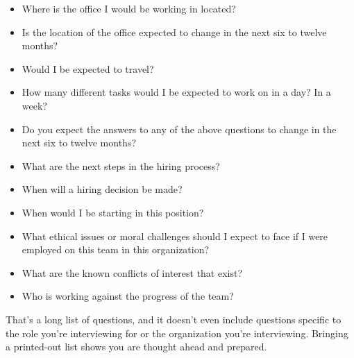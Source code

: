 \begin{itemize}
    \item Where is the office I would be working in located?
    \item Is the location of the office expected to change in the next six to twelve months?
    \item Would I be expected to travel?
    
    \item How many different tasks would I be expected to work on in a day? In a week?
    
    \item Do you expect the answers to any of the above questions to change in the next six to twelve months?

    \item What are the next steps in the hiring process?
    \item When will a hiring decision be made?
    \item When would I be starting in this position?
    
    \item What ethical issues or moral challenges should I expect to face if I were employed on this team in this organization?
    \item What are the known conflicts of interest that exist?

    \item Who is working against the progress of the team?
    
\end{itemize}

That's a long list of questions, and it doesn't even include questions specific to the role you're interviewing for or the organization you're interviewing. Bringing a printed-out list shows you are thought ahead and prepared. 

